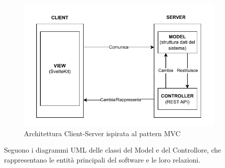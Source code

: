 \documentclass[a4paper]{article}
\begin{document}
\begin{figure}[H]
  \begin{center}
    \includegraphics[width=0.9\textwidth]{ClientServerMVC.pdf}
  \end{center}
  \caption{Architettura Client-Server ispirata al pattern MVC} 
  \label{fig:mvc}
\end{figure}
\noindent
Seguono i diagrammi UML delle classi del Model e del Controllore, che rappresentano le entità principali del software e le loro relazioni.
\end{document}
